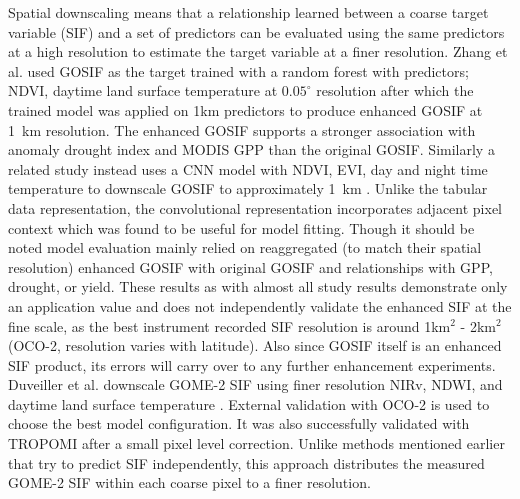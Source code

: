 Spatial downscaling means that a relationship learned between a coarse target variable (SIF) and a set of predictors can be evaluated using the same predictors at a high resolution to estimate the target variable at a finer resolution. Zhang et al. \cite{zhang2024spatial} used GOSIF \cite{li2019global} as the target trained with a random forest with predictors; NDVI, daytime land surface temperature at $0.05^{\circ}$ resolution after which the trained model was applied on 1km predictors to produce enhanced GOSIF at 1~km resolution. The enhanced GOSIF supports a stronger association with anomaly drought index and MODIS GPP than the original GOSIF. Similarly a related study instead uses a CNN model with NDVI, EVI, day and night time temperature to downscale GOSIF to approximately 1~km \cite{zhang2020downscaling}. Unlike the tabular data representation, the convolutional representation incorporates adjacent pixel context which was found to be useful for model fitting. Though it should be noted model evaluation mainly relied on reaggregated (to match their spatial resolution) enhanced GOSIF with original GOSIF and relationships with GPP, drought, or yield. These results as with almost all study results demonstrate only an application value and does not independently validate the enhanced SIF at the fine scale, as the best instrument recorded SIF resolution is around 1km$^2$ - 2km$^2$ (OCO-2, resolution varies with latitude). Also since GOSIF itself is an enhanced SIF product, its errors will carry over to any further enhancement experiments. Duveiller et al. downscale GOME-2 SIF using finer resolution NIRv, NDWI, and daytime land surface temperature \cite{duveiller2020spatially}. External validation with OCO-2 is used to choose the best model configuration. It was also successfully validated with TROPOMI after a small pixel level correction. Unlike methods mentioned earlier that try to predict SIF independently, this approach distributes the measured GOME-2 SIF within each coarse pixel to a finer resolution. 

